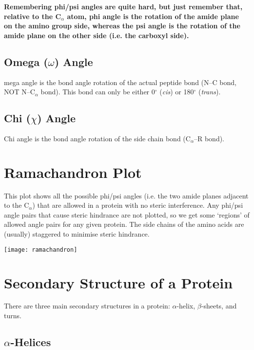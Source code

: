 \documentclass[a4paper, 12pt]{report}
\begin{document}
\vspace{1.0cm}

\noindent
\textbf{Remembering phi/psi angles are quite hard, but just remember that, relative to the C$_{\alpha}$ atom, phi angle is the rotation of the amide plane on the amino group side, whereas the psi angle is the rotation of the amide plane on the other side (i.e. the carboxyl side).}

\subsection{Omega ($\omega$) Angle}

mega angle is the bond angle rotation of the actual peptide bond (N--C bond, NOT N--C$_{\alpha}$ bond).
This bond can only be either 0$^{\circ}$ (\textit{cis}) or 180$^{\circ}$ (\textit{trans}).

\subsection{Chi ($\chi$) Angle}

Chi angle is the bond angle rotation of the side chain bond (C$_{\alpha}$--R bond).

\section{Ramachandron Plot}

This plot shows all the possible phi/psi angles (i.e. the two amide planes adjacent to the C$_{\alpha}$) that are allowed in a protein with no steric interference.
Any phi/psi angle pairs that cause steric hindrance are not plotted, so we get some `regions' of allowed angle pairs for any given protein.
The side chains of the amino acids are (usually) staggered to minimise steric hindrance.

\vspace{0.5cm}

\texttt{[image: ramachandron]}

\section{Secondary Structure of a Protein}

There are three main secondary structures in a protein: $\alpha$-helix, $\beta$-sheets, and turns.

\subsection{$\alpha$-Helices}
\end{document}
